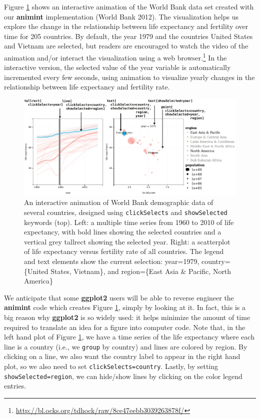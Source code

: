 \documentclass[12pt,]{article}
\let\rmarkdownfootnote\footnote%
\def\footnote{\protect\rmarkdownfootnote}
\theoremstyle{definition}
\theoremstyle{definition}
\theoremstyle{definition}
\theoremstyle{remark}
\begin{document}
Figure \ref{fig:worldbank} shows an interactive animation of the World
Bank data set created with our \textbf{animint} implementation (World
Bank 2012). The visualization helps us explore the change in the
relationship between life expectancy and fertility over time for 205
countries. By default, the year 1979 and the countries United States and
Vietnam are selected, but readers are encouraged to watch the video of
the animation and/or interact the visualization using a web
browser.\footnote{\url{http://bl.ocks.org/tdhock/raw/8ce47eebb3039263878f/}}
In the interactive version, the selected value of the year variable is
automatically incremented every few seconds, using animation to
visualize yearly changes in the relationship between life expectancy and
fertility rate.

\begin{figure}
\centering
\includegraphics{images/figure-1}
\caption{\label{fig:worldbank}An interactive animation of World Bank
demographic data of several countries, designed using
\texttt{clickSelects} and \texttt{showSelected} keywords (top). Left: a
multiple time series from 1960 to 2010 of life expectancy, with bold
lines showing the selected countries and a vertical grey tallrect
showing the selected year. Right: a scatterplot of life expectancy
versus fertility rate of all countries. The legend and text elements
show the current selection: year=1979, country=\{United States,
Vietnam\}, and region=\{East Asia \& Pacific, North America\}}
\end{figure}

We anticipate that some \textbf{ggplot2} users will be able to reverse
engineer the \textbf{animint} code which creates Figure
\ref{fig:worldbank}, simply by looking at it. In fact, this is a big
reason why \textbf{ggplot2} is so widely used: it helps minimize the
amount of time required to translate an idea for a figure into computer
code. Note that, in the left hand plot of Figure \ref{fig:worldbank}, we
have a time series of the life expectancy where each line is a country
(i.e., we \texttt{group} by country) and lines are colored by region. By
clicking on a line, we also want the country label to appear in the
right hand plot, so we also need to set \texttt{clickSelects=country}.
Lastly, by setting \texttt{showSelected=region}, we can hide/show lines
by clicking on the color legend entries.
\end{document}
